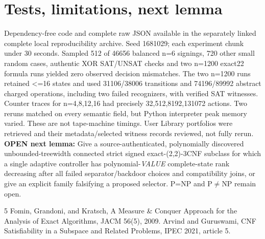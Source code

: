 \documentclass[11pt]{article}
\begin{document}
\section{Tests, limitations, next lemma}
Dependency-free code and complete raw JSON available in the separately linked complete local reproducibility archive. Seed 1681029; each experiment chunk under 30 seconds. Sampled 512 of 46656 balanced n=6 signings, 720 other small random cases, authentic XOR SAT/UNSAT checks and two n=1200 exact22 formula runs yielded zero observed decision mismatches. The two n=1200 runs retained <=16 states and used 31106/38006 transitions and 74196/89992 abstract charged operations, including two failed recognizers, with verified SAT witnesses. Counter traces for n=4,8,12,16 had precisely 32,512,8192,131072 actions. Two reruns matched on every semantic field, but Python interpreter peak memory varied. These are not tape-machine timings. User Library portfolios were retrieved and their metadata/selected witness records reviewed, not fully rerun.
\noindent\textbf{OPEN next lemma:} Give a source-authenticated, polynomially discovered unbounded-treewidth connected strict signed exact-(2,2)-3CNF subclass for which a single adaptive controller has polynomial-\emph{VALUE} complete-state rank decreasing after all failed separator/backdoor choices and compatibility joins, or give an explicit family falsifying a proposed selector. P=NP and P$\ne$NP remain open.
\begin{thebibliography}{5}
 Fomin, Grandoni, and Kratsch, A Measure \& Conquer Approach for the Analysis of Exact Algorithms, JACM 56(5), 2009.
 Arvind and Guruswami, CNF Satisfiability in a Subspace and Related Problems, IPEC 2021, article 5.
\end{thebibliography}
\end{document}
